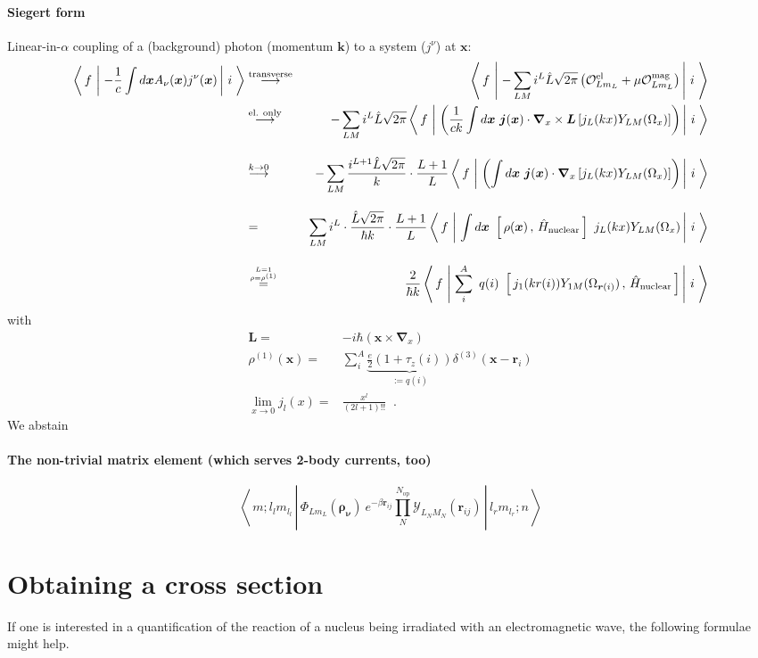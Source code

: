 \documentclass[onecolumn,preprint,superscriptaddress,nofootinbib,notitlepage,10pt,linenumbers]{revtex4-1}
\newcommand{\be}{\begin{equation}}
\newcommand{\ee}{\end{equation}}
\newcommand{\la}{\label}
\newcommand{\ve}[1]{\ensuremath{\boldsymbol{#1}}}
\newcommand{\me}[3] {\left\langle\,#1\,\left|\left.\,#2\,\right|\,#3\,\right.\right\rangle}
\begin{document}
\paragraph{Siegert form}
Linear-in-$\alpha$ coupling of a (background) photon (momentum $\ve{k}$) to a system ($j^\nu$) at $\ve{x}$:
\begin{align}\la{eq.siegert}
\me{f}{-\frac{1}{c}\int d\ve{x}A_\nu(\ve{x})j^\nu(\ve{x})}{i}&\stackrel{\text{transverse}}{\longrightarrow}&\me{f}{-\sum_{LM}i^L\hat{L}\sqrt{2\pi}
\left(\mathcal{O}_{Lm_L}^{{\text{el}}}+\mu\mathcal{O}_{Lm_L}^{{\text{mag}}}\right)}{i}\\
&\stackrel{\text{el. only}}{\longrightarrow}&-\sum_{LM}i^L\hat{L}\sqrt{2\pi}\me{f}{\left(\frac{1}{ck}\int d\ve{x}~\ve{j}(\ve{x})\cdot\ve{\nabla}_x\times\ve{L}\left[j_L(kx)Y_{LM}(\Omega_x)\right]\right)}{i}
\\[1em]
&\stackrel{k\to 0}{\longrightarrow}&~-\sum_{LM}\frac{i^{L+1}\hat{L}\sqrt{2\pi}}{k}\cdot\frac{L+1}{L}\me{f}{\left(\int d\ve{x}~\ve{j}(\ve{x})\cdot\ve{\nabla}_x\left[j_L(kx)Y_{LM}(\Omega_x)\right]\right)}{i}
\\[1em]
&=&~\sum_{LM}i^L\cdot\frac{\hat{L}\sqrt{2\pi}}{\hbar k}\cdot\frac{L+1}{L}\me{f}{\int d\ve{x}~\left[\,\rho(\ve{x})\,,\,\hat{H}_\text{nuclear}\,\right]~j_L(kx)Y_{LM}(\Omega_x)}{i}\\[1em]
&\overset{\scriptstyle {L=1\atop \rho=\rho^{(1)}}}{=}&~\frac{2}{\hbar k}\me{f}{\sum\limits_i^A~q(i)~\left[\,j_1(kr(i))Y_{1M}(\Omega_{\ve{r}(i)})\,,\,\hat{H}_\text{nuclear}\,\right]}{i}
\end{align}
with
\begin{align}\la{eq.siegert.descr}
\ve{L}=&-i\hbar\left(\ve{x}\times\ve{\nabla}_x\right)\\
\rho^{(1)}(\ve{x})=&\sum\limits_i^A\underbrace{\frac{e}{2}(1+\tau_z(i))}_{:=q(i)}\delta^{(3)}(\ve{x}-\ve{r}_i)\\
\lim\limits_{x\to 0}j_l(x)=&\frac{x^l}{(2l+1)!!}\;\;.
\end{align}
We abstain 

\paragraph{The non-trivial matrix element (which serves {\bf 2-body} currents, too)}
\be\la{eq.theme}
\me{m;l_lm_{l_l}}{\Phi_{Lm_L}(\ve{\rho_\nu})~e^{-\beta\ve{r}_{ij}}\prod\limits_{N}^{N_{\text{op}}}\mathcal{Y}_{L_NM_N}(\ve{r}_{ij})}{l_rm_{l_r};n}
\ee

\newpage
\section{Obtaining a cross section}
If one is interested in a quantification of the reaction of a nucleus being irradiated with
an electromagnetic wave, the following formulae might help.
\end{document}
